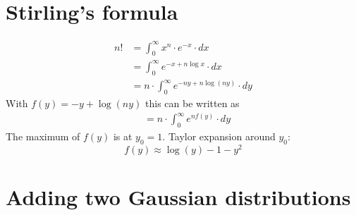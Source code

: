 \documentclass[11 pt]{article}
\begin{document}
    \section{Stirling's formula}

        \begin{align}
            n!
            &=\int_0^\infty x^n\cdot e^{-x}\cdot dx \\
            &=\int_0^\infty e^{-x+n\log x}\cdot dx \\
            &=n\cdot\int_0^\infty e^{-ny+n\log(ny)}\cdot dy
        \end{align}
        With $f(y)=-y+\log(ny)$ this can be written as
        \begin{align}
            &=n\cdot\int_0^\infty e^{nf(y)}\cdot dy
        \end{align}
        The maximum of $f(y)$ is at $y_0=1$. Taylor expansion 
        around $y_0$:
        \begin{equation}
            f(y)\approx\log(y)-1-y^2
        \end{equation}

    \newpage
    \section{Adding two Gaussian distributions}
        
\end{document}
